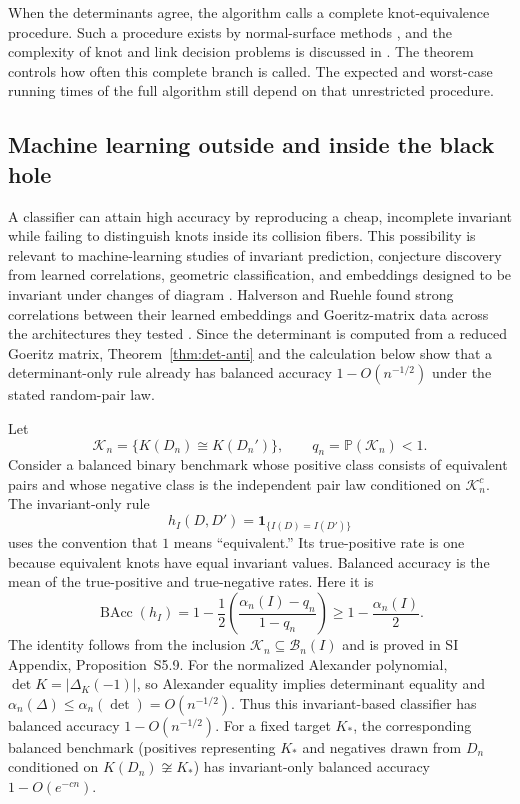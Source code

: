 \documentclass[9pt,twoside]{pnas-new}
\theoremstyle{definition}
\theoremstyle{remark}
\renewcommand{\Pr}{\mathbb{P}}
\newcommand{\SILocation}[1]{SI Appendix, #1}
\newcommand{\SIMachineLearningBenchmark}{Proposition~S5.9}
\begin{document}
When the determinants agree, the algorithm calls a complete knot-equivalence procedure.  Such a procedure exists by normal-surface methods \cite{haken1961,hemion1992}, and the complexity of knot and link decision problems is discussed in \cite{hasslagariaspippenger1999,lackenby2021}.  The theorem controls how often this complete branch is called.  The expected and worst-case running times of the full algorithm still depend on that unrestricted procedure.

\subsection{Machine learning outside and inside the black hole}
\label{subsec:machine-learning}
A classifier can attain high accuracy by reproducing a cheap, incomplete invariant while failing to distinguish knots inside its collision fibers.  This possibility is relevant to machine-learning studies of invariant prediction, conjecture discovery from learned correlations, geometric classification, and embeddings designed to be invariant under changes of diagram \cite{daviesetal2021,cravenetal2023,sleimanetal2024,halversonruehle2025}.  Halverson and Ruehle found strong correlations between their learned embeddings and Goeritz-matrix data across the architectures they tested \cite{halversonruehle2025}.  Since the determinant is computed from a reduced Goeritz matrix, Theorem~\ref{thm:det-anti} and the calculation below show that a determinant-only rule already has balanced accuracy $1-O(n^{-1/2})$ under the stated random-pair law.

Let
\[
 \mathcal K_n=\{K(D_n)\cong K(D_n')\},
 \qquad q_n=\Pr(\mathcal K_n)<1.
\]
Consider a balanced binary benchmark whose positive class consists of equivalent pairs and whose negative class is the independent pair law conditioned on $\mathcal K_n^c$.  The invariant-only rule
\[
 h_I(D,D')=\mathbf 1_{\{I(D)=I(D')\}}
\]
uses the convention that $1$ means ``equivalent.''  Its true-positive rate is one because equivalent knots have equal invariant values.  Balanced accuracy is the mean of the true-positive and true-negative rates.  Here it is
\begin{equation}
 \operatorname{BAcc}(h_I)
 =1-\frac12(\frac{\alpha_n(I)-q_n}{1-q_n})
 \ge
 1-\frac{\alpha_n(I)}{2}.
 \label{eq:ml-balanced-accuracy}
\end{equation}
The identity follows from the inclusion $\mathcal K_n\subseteq\mathcal B_n(I)$ and is proved in \SILocation{\SIMachineLearningBenchmark{}}.  For the normalized Alexander polynomial, $\det K=|\Delta_K(-1)|$, so Alexander equality implies determinant equality and $\alpha_n(\Delta)\le\alpha_n(\det)=O(n^{-1/2})$.  Thus this invariant-based classifier has balanced accuracy $1-O(n^{-1/2})$.  For a fixed target $K_*$, the corresponding balanced benchmark (positives representing $K_*$ and negatives drawn from $D_n$ conditioned on $K(D_n)\not\cong K_*$) has invariant-only balanced accuracy $1-O(e^{-cn})$.
\end{document}
